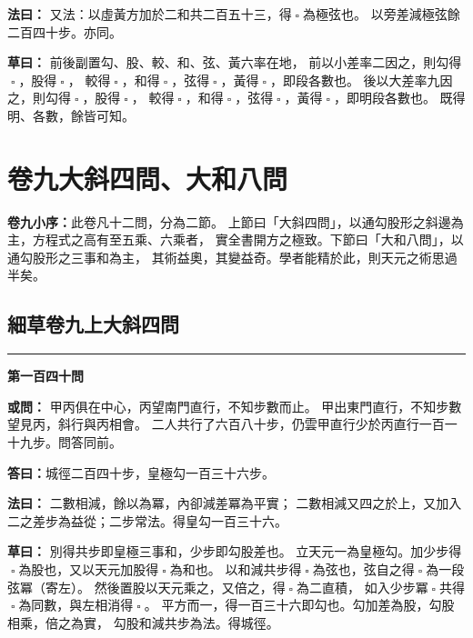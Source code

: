 \documentclass[11pt,a4paper]{article}
\let\origsquare\square
\renewcommand{\square}{\ensuremath{\origsquare}}%
\newcommand{\longline}{\noindent\rule{\textwidth}{0.4pt}}
\newcommand{\owen}[1]{%
  \par\vspace{0.4em}%
  \noindent\textcolor{problemcolor}{\textbf{或問：}}{\tradfont #1}\par\nopagebreak%
}
\newcommand{\fayue}[1]{%
  \par\noindent\textcolor{methodcolor}{\textbf{法曰：}}{\tradfont #1}\par\nopagebreak%
}
\newcommand{\tsaoyue}[1]{%
  \par\noindent\textcolor{workcolor}{\textbf{草曰：}}{\tradfont #1}\par%
}
\newcommand{\dayue}[1]{%
  \par\noindent\textcolor{anscolor}{\textbf{答曰：}}{\tradfont #1}\par\nopagebreak%
}
\newcommand{\wen}[1]{\par\vspace{0.3em}\noindent\textcolor{problemcolor}{\textbf{第#1問}}\par}
\begin{document}
\fayue{%
又法：以虛黃方加於二和共二百五十三，得$ \; \square \; $為極弦也。
以旁差減極弦餘二百四十步。亦同。}

\tsaoyue{%
前後副置勾、股、較、和、弦、黃六率在地，
前以小差率二因之，則勾得$ \; \square \; $，股得$ \; \square \; $，
較得$ \; \square \; $，和得$ \; \square \; $，弦得$ \; \square \; $，黃得$ \; \square \; $，即段各數也。
後以大差率九因之，則勾得$ \; \square \; $，股得$ \; \square \; $，
較得$ \; \square \; $，和得$ \; \square \; $，弦得$ \; \square \; $，黃得$ \; \square \; $，即明段各數也。
既得明、各數，餘皆可知。}

\newpage


\section{\tradfont 卷九\quad 大斜四問、大和八問}
\label{sec:vol9}

\begin{tradfont}
\noindent\textbf{卷九小序：}此卷凡十二問，分為二節。
上節曰「大斜四問」，以通勾股形之斜邊為主，方程式之高有至五乘、六乘者，
實全書開方之極致。下節曰「大和八問」，以通勾股形之三事和為主，
其術益奧，其變益奇。學者能精於此，則天元之術思過半矣。
\end{tradfont}

\subsection{\tradfont 細草卷九上\quad 大斜四問}

\begin{center}
\longline
\end{center}

\wen{一百四十}
\owen{%
甲丙俱在中心，丙望南門直行，不知步數而止。
甲出東門直行，不知步數望見丙，斜行與丙相會。
二人共行了六百八十步，仍雲甲直行少於丙直行一百一十九步。問答同前。}
\dayue{城徑二百四十步，皇極勾一百三十六步。}

\fayue{%
二數相減，餘以為冪，內卻減差冪為平實；
二數相減又四之於上，又加入二之差步為益從；二步常法。得皇勾一百三十六。}

\tsaoyue{%
別得共步即皇極三事和，少步即勾股差也。
立天元一為皇極勾。加少步得$ \; \square \; $為股也，又以天元加股得$ \; \square \; $為和也。
以和減共步得$ \; \square \; $為弦也，弦自之得$ \; \square \; $為一段弦冪（寄左）。
然後置股以天元乘之，又倍之，得$ \; \square \; $為二直積，
如入少步冪$ \; \square \; $共得$ \; \square \; $為同數，與左相消得$ \; \square \; $。
平方而一，得一百三十六即勾也。勾加差為股，勾股相乘，倍之為實，
勾股和減共步為法。得城徑。}
\end{document}

